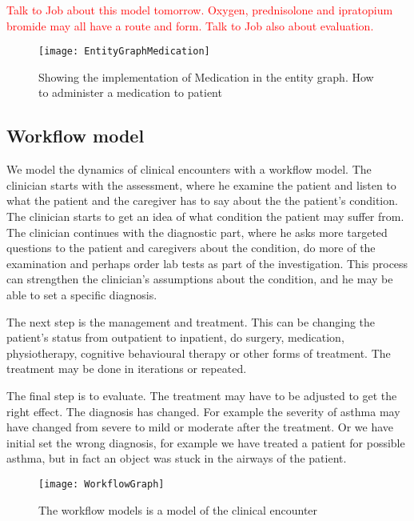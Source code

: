 
 \textcolor{red}{Talk to Job about this model tomorrow. Oxygen, prednisolone and ipratopium bromide may all have a route and form. Talk to Job also about evaluation.}
\begin{figure}[h!]
	\caption {Showing the implementation of Medication in the entity graph. How to administer a medication to patient}
	\label{fig:EntityGraphMedication}
	\texttt{[image: EntityGraphMedication]}
\end{figure}





\subsection{Workflow model}
We model the dynamics of clinical encounters with a workflow model. The clinician starts with the assessment, where he examine the patient and listen to what the patient and the caregiver has to say about the the patient's condition. The clinician starts to get an idea of what condition the patient may suffer from. The clinician continues with the diagnostic part, where he asks more targeted questions to the patient and caregivers about the condition, do more of the examination and perhaps order lab tests as part of the investigation. This process can strengthen the clinician's assumptions about the condition, and he may be able to set a specific diagnosis.

The next step is the management and treatment. This can be changing the patient's status from outpatient to inpatient, do surgery, medication, physiotherapy, cognitive behavioural therapy or other forms of treatment. The treatment may be done in iterations or repeated.


The final step is to evaluate. The treatment may have to be adjusted to get the right effect. The diagnosis has changed. For example the severity of asthma may have changed from severe to mild or moderate after the treatment. Or we have initial set the wrong diagnosis, for example we have treated a patient for possible asthma, but in fact an object was stuck in the airways of the patient.


\begin{figure}[h!]
	\caption {The workflow models is a model of the clinical encounter}
	\label{fig:WorkflowGraph}
	\texttt{[image: WorkflowGraph]}
\end{figure}

